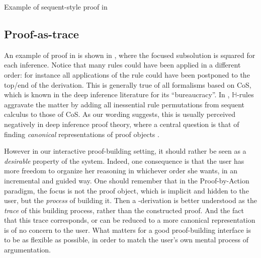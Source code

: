 \begin{marginfigure}
  
  \caption{Example of sequent-style proof in }
\end{marginfigure}

\subsection{Proof-as-trace}

An example of proof in  is shown in , where the
focused subsolution is squared for each inference. Notice that many rules could
have been applied in a different order: for instance all applications of the
{} rule could have been postponed to the top/end of the derivation.
This is generally true of all formalisms based on CoS, which is known in the
deep inference literature for its ``bureaucracy''. In ,
$\mathbb{H}$-rules aggravate the matter by adding all inessential rule
permutations from sequent calculus to those of CoS. As our wording suggests,
this is usually perceived negatively in deep inference proof theory, where a
central question is that of finding \emph{canonical} representations of proof
objects .

However in our interactive proof-building setting, it should rather be seen as a
\emph{desirable} property of the system. Indeed, one consequence is that the
user has more freedom to organize her reasoning in whichever order she wants, in
an incremental and guided way. One should remember that in the Proof-by-Action
paradigm, the focus is not the proof object, which is implicit and hidden to the
user, but the \emph{process} of building it. Then a -derivation is
better understood as the \emph{trace} of this building process, rather than the
constructed proof. And the fact
that this trace corresponds, or can be reduced to a more canonical
representation is of no concern to the user. What matters for a good
proof-building interface is to be as flexible as possible, in order to match the
user's own mental process of argumentation.

